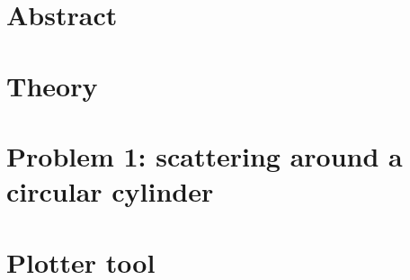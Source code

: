 \documentclass{report}
\begin{document}
    
    

\chapter*{Abstract}
    
    
    
\chapter{Theory}  
    


\chapter{Problem 1: scattering around a circular cylinder}
    
    
\chapter{Plotter tool}
    
        


\end{document}
